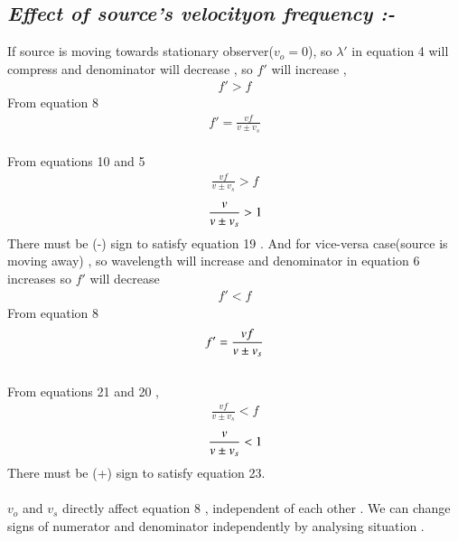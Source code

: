 \documentclass[journal,12pt,twocolumn]{IEEEtran}
\theoremstyle{remark}
\begin{document}
\subsection*{\textit{Effect \;of  \;source's  \;velocity\;on \;frequency :-}}
If source is moving towards stationary observer($v_o =0$), so $\lambda'$ in equation 4 will compress and denominator will decrease , so $f'$ will increase , \begin{align}f'>f\end{align}From equation  8
\begin{align}f' = \frac{vf}{v \pm v_s}\end{align}\\
From equations  10 and 5
\begin{align} \frac{v f}{v \pm v_s} > f\end{align}
\begin{align}{\label{eq17}} \frac{v}{v \pm v_s} > 1\end{align}
 There must be (-) sign to satisfy equation  19 .
And for vice-versa case(source is moving away) , so wavelength will increase and denominator in equation 6 increases so $f'$ will decrease \\
\begin{align}f'<f\end{align}
From equation 8
\begin{align}{\label{eq19}} f' = \frac{vf}{v \pm v_s}\end{align}\\
From equations 21 and 20 , 
\begin{align} \frac{v f}{v \pm v_s} < f\end{align}
\begin{align}{\label{eq21}} \frac{v}{v \pm v_s} < 1\end{align}
 There must be (+) sign to satisfy equation 23.\\\\
 $v_o$ and $v_s$ directly affect equation 8 , independent of each other . We can change signs of numerator and denominator independently by analysing situation .\\\\
    
\end{document}

